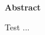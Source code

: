 \vspace*{0.5cm}
\begin{center}
   \huge{\textbf{Abstract}}
\end{center}

\thispagestyle{empty}
\vspace{3cm}

Test ...